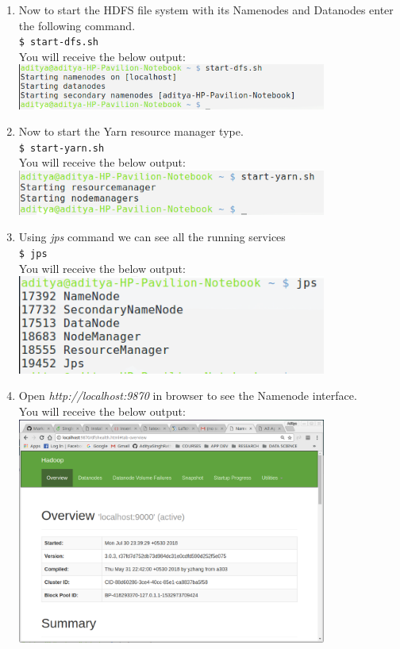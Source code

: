 \documentclass[12pt]{article}%
\begin{document}
\begin{enumerate}
\item Now to start the HDFS file system with  its Namenodes and Datanodes enter the following command.\\
\lstinline{$ start-dfs.sh}\\
You will receive the below output:\\
\includegraphics[width=0.8\textwidth]{startdfs.png}


\item Now to start the Yarn resource manager type.\\
\lstinline{$ start-yarn.sh}\\
You will receive the below output:\\
\includegraphics[width=0.8\textwidth]{startyarn.png}


\item Using \emph{jps} command we can see all the running services\\
\lstinline{$ jps}\\
You will receive the below output:\\
\includegraphics[width=0.8\textwidth]{jpsout.png}

\item Open \emph{http://localhost:9870} in browser to see the Namenode interface.\\
You will receive the below output:\\
\includegraphics[width=0.8\textwidth]{hadooprun.png}



\end{enumerate}
\end{document}
